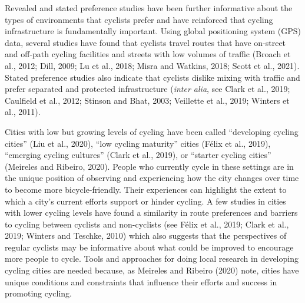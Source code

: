 \documentclass[]{elsarticle} %
\begin{document}
Revealed and stated preference studies have been further informative
about the types of environments that cyclists prefer and have reinforced
that cycling infrastructure is fundamentally important. Using global
positioning system (GPS) data, several studies have found that cyclists
travel routes that have on-street and off-path cycling facilities and
streets with low volumes of traffic (Broach et al., 2012; Dill, 2009; Lu
et al., 2018; Misra and Watkins, 2018; Scott et al., 2021). Stated
preference studies also indicate that cyclists dislike mixing with
traffic and prefer separated and protected infrastructure (\emph{inter
alia}, see Clark et al., 2019; Caulfield et al., 2012; Stinson and Bhat,
2003; Veillette et al., 2019; Winters et al., 2011).

Cities with low but growing levels of cycling have been called
``developing cycling cities'' (Liu et al., 2020), ``low cycling
maturity'' cities (Félix et al., 2019), ``emerging cycling cultures''
(Clark et al., 2019), or ``starter cycling cities'' (Meireles and
Ribeiro, 2020). People who currently cycle in these settings are in the
unique position of observing and experiencing how the city changes over
time to become more bicycle-friendly. Their experiences can highlight
the extent to which a city's current efforts support or hinder cycling.
A few studies in cities with lower cycling levels have found a
similarity in route preferences and barriers to cycling between cyclists
and non-cyclists (see Félix et al., 2019; Clark et al., 2019; Winters
and Teschke, 2010) which also suggests that the perspectives of regular
cyclists may be informative about what could be improved to encourage
more people to cycle. Tools and approaches for doing local research in
developing cycling cities are needed because, as Meireles and Ribeiro
(2020) note, cities have unique conditions and constraints that
influence their efforts and success in promoting cycling.
\end{document}
